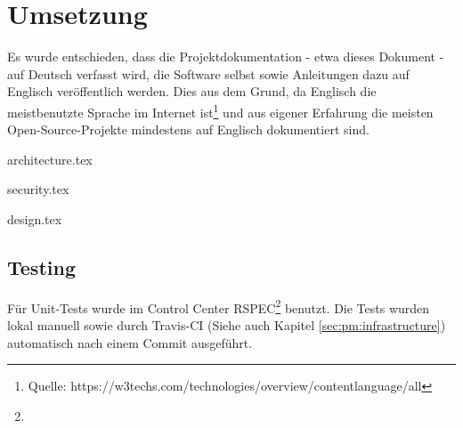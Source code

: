 \begin{comment}
(Implementierung) Architektur und Design beschrieben: Mit begründeten Architekturentscheidungen, mit Diskussion, wie Qualitätsattribute sichergestellt wurden (welche Qualität wurde erreicht?), mit Dokumentation, welche Experimente/Tests durchgeführt wurden und welche Lösungsoptionen aufgrund der Ergebnisse dieser Experimente/Tests
verworfen wurden (was ging schief?)
\end{comment}

\chapter{Umsetzung}

Es wurde entschieden, dass die Projektdokumentation - etwa dieses Dokument - auf Deutsch verfasst wird, die Software selbst sowie Anleitungen dazu auf Englisch veröffentlich werden. Dies aus dem Grund, da Englisch die meistbenutzte Sprache im Internet ist\footnote{Quelle: https://w3techs.com/technologies/overview/content\textunderscore language/all} und aus eigener Erfahrung die meisten Open-Source-Projekte mindestens auf Englisch dokumentiert sind.

\xxx


{architecture.tex}

\clearpage
{security.tex}

\clearpage
{design.tex}

\clearpage
\section{Testing}


Für Unit-Tests wurde im Control Center RSPEC\footnote{} benutzt. Die Tests wurden lokal manuell sowie durch Travis-CI (Siehe auch Kapitel \ref{sec:pm:infrastructure}) automatisch nach einem Commit ausgeführt.